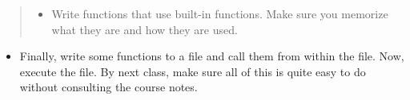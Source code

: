 \documentclass[letterpaper,10pt,english]{sphinxmanual}
\begin{document}
\begin{quote}
\begin{itemize}
\begin{sphinxVerbatim}[commandchars=\\\{\}]
 
     

 
     
     
\end{sphinxVerbatim}
\begin{itemize}
\item {} 
Write functions that use built-in functions. Make sure you
memorize what they are and how they are used.

\end{itemize}

\end{itemize}
\end{quote}
\begin{itemize}
\item {} 
Finally, write some functions to a file and call them from within
the file. Now, execute the file. By next class, make sure all of this
is quite easy to do without consulting the course notes.

\end{itemize}
\end{document}
